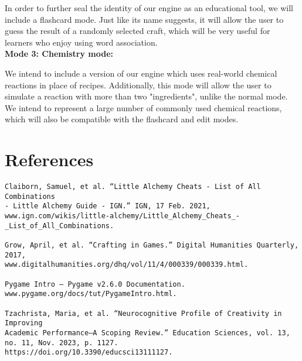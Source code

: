 \documentclass[fontsize=11pt]{article}
\begin{document}
In order to further seal the identity of our engine as an educational tool, we will include a flashcard mode. Just like its name suggests, it will allow the user to guess the result of a randomly selected craft, which will be very useful for learners who enjoy using word association.
\\[3pt]
\textbf{Mode 3: Chemistry mode:}

We intend to include a version of our engine which uses real-world chemical reactions in place of recipes. Additionally, this mode will allow the user to simulate a reaction with more than two "ingredients", unlike the normal mode. We intend to represent a large number of commonly used chemical reactions, which will also be compatible with the flashcard and edit modes.

\section*{References}
\begin{verbatim}
Claiborn, Samuel, et al. “Little Alchemy Cheats - List of All Combinations 
- Little Alchemy Guide - IGN.” IGN, 17 Feb. 2021, 
www.ign.com/wikis/little-alchemy/Little_Alchemy_Cheats_-_List_of_All_Combinations.

Grow, April, et al. “Crafting in Games.” Digital Humanities Quarterly, 2017, 
www.digitalhumanities.org/dhq/vol/11/4/000339/000339.html.

Pygame Intro — Pygame v2.6.0 Documentation. www.pygame.org/docs/tut/PygameIntro.html.

Tzachrista, Maria, et al. “Neurocognitive Profile of Creativity in Improving 
Academic Performance—A Scoping Review.” Education Sciences, vol. 13, no. 11, Nov. 2023, p. 1127. 
https://doi.org/10.3390/educsci13111127.

\end{verbatim}
\end{document}
